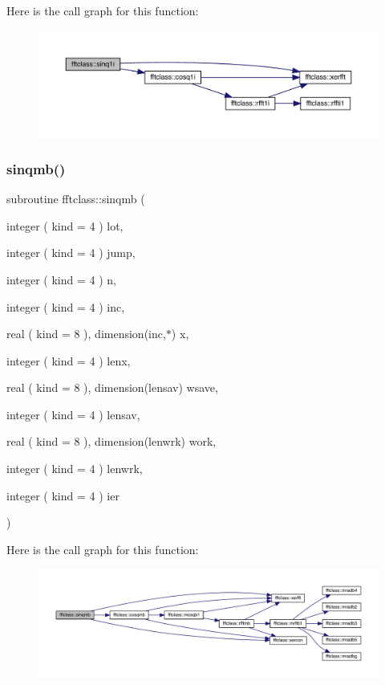 Here is the call graph for this function\+:\nopagebreak
\begin{figure}[H]
\begin{center}
\leavevmode
\includegraphics[width=350pt]{namespacefftclass_aa0d2ffdfc38a79ecd1b47de75f3d1084_cgraph}
\end{center}
\end{figure}
\mbox{\label{namespacefftclass_aa7e7e40b824e045f452a09a2e7abf333}} 
\subsubsection{\texorpdfstring{sinqmb()}{sinqmb()}}
{\footnotesize\ttfamily subroutine fftclass\+::sinqmb (\begin{DoxyParamCaption}\item[{integer ( kind = 4 )}]{lot,  }\item[{integer ( kind = 4 )}]{jump,  }\item[{integer ( kind = 4 )}]{n,  }\item[{integer ( kind = 4 )}]{inc,  }\item[{real ( kind = 8 ), dimension(inc,$\ast$)}]{x,  }\item[{integer ( kind = 4 )}]{lenx,  }\item[{real ( kind = 8 ), dimension(lensav)}]{wsave,  }\item[{integer ( kind = 4 )}]{lensav,  }\item[{real ( kind = 8 ), dimension(lenwrk)}]{work,  }\item[{integer ( kind = 4 )}]{lenwrk,  }\item[{integer ( kind = 4 )}]{ier }\end{DoxyParamCaption})}

Here is the call graph for this function\+:\nopagebreak
\begin{figure}[H]
\begin{center}
\leavevmode
\includegraphics[width=350pt]{namespacefftclass_aa7e7e40b824e045f452a09a2e7abf333_cgraph}
\end{center}
\end{figure}
\mbox{\label{namespacefftclass_ae56c7f24f27f2fb48f15359441b5e82f}} 
